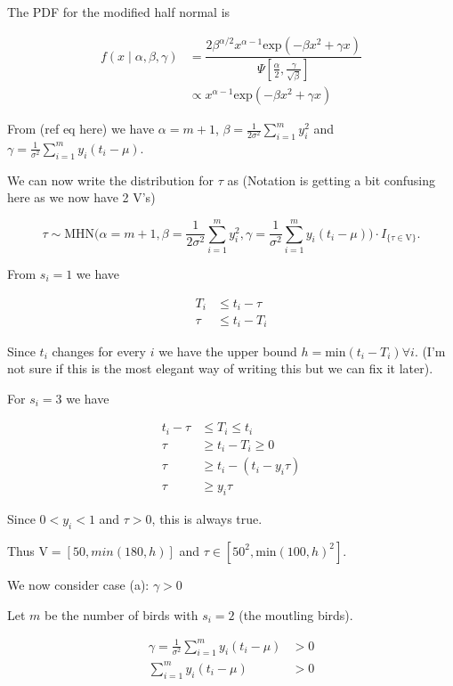 \documentclass[
  12pt,
]{article}
\begin{document}
The PDF for the modified half normal is

\[
\begin{aligned}
f(x\mid \alpha, \beta, \gamma) & = \dfrac{2 \beta^{\alpha/2} x^{\alpha-1} \text{exp}(-\beta x^2 + \gamma x)}{\Psi [\frac{\alpha}{2}, \frac{\gamma}{\sqrt{\beta}}]} \\
& \propto x^{\alpha-1} \text{exp}(-\beta x^2 + \gamma x) 
\end{aligned}
\]

From (ref eq here) we have \(\alpha = m+1\),
\(\beta = \frac{1}{2\sigma^2} \sum^m_{i=1} y_i^2\) and
\(\gamma = \frac{1}{\sigma^2} \sum^m_{i=1} y_i(t_i-\mu)\).

We can now write the distribution for \(\tau\) as (Notation is getting a
bit confusing here as we now have 2 V's)

\[
\tau \sim \text{MHN}\big(\alpha = m+1, \beta = \frac{1}{2\sigma^2} \sum^m_{i=1} y_i^2, \gamma = \frac{1}{\sigma^2} \sum^m_{i=1} y_i(t_i-\mu)\big) \cdot I_{\{\tau \in \text{V}\}}.
\]

From \(s_i=1\) we have

\[
\begin{aligned}
T_i & \leq t_i - \tau \\
\tau & \leq t_i - T_i
\end{aligned}
\]

Since \(t_i\) changes for every \(i\) we have the upper bound
\(h = \text{min}(t_i -T_i) \forall i\). (I'm not sure if this is the
most elegant way of writing this but we can fix it later).

For \(s_i = 3\) we have

\[
\begin{aligned}
t_i - \tau & \leq T_i \leq t_i \\
\tau & \geq t_i - T_i \geq 0 \\
\tau & \geq t_i - (t_i - y_i \tau) \\
\tau & \geq y_i\tau
\end{aligned}
\]

Since \(0<y_i<1\) and \(\tau>0\), this is always true.

Thus \(\text{V} = [50,min(180,h)]\) and
\(\tau \in [50^2, \text{min}(100,h)^2]\).

We now consider case (a): \(\gamma > 0\)

Let \(m\) be the number of birds with \(s_i=2\) (the moutling birds).

\[
\begin{aligned}
\gamma = \frac{1}{\sigma^2} \sum^m_{i=1} y_i(t_i-\mu) & > 0 \\
\sum^m_{i=1} y_i(t_i-\mu) & > 0
\end{aligned}
\]
\end{document}
